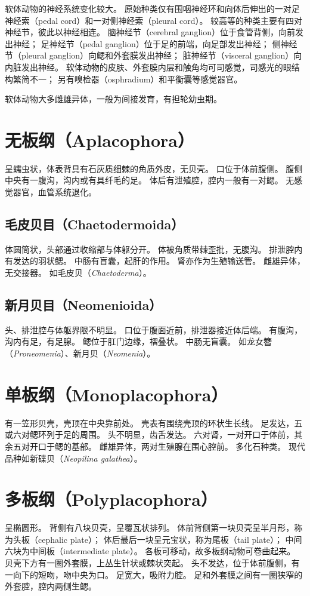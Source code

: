 \documentclass[11pt]{article}
\begin{document}
软体动物的神经系统变化较大。
原始种类仅有围咽神经环和向体后伸出的一对足神经索（pedal cord）和一对侧神经索（pleural cord）。
较高等的种类主要有四对神经节，彼此以神经相连。
脑神经节（cerebral ganglion）位于食管背侧，向前发出神经；
足神经节（pedal ganglion）位于足的前端，向足部发出神经；
侧神经节（pleural ganglion）向鳃和外套膜发出神经；
脏神经节（visceral ganglion）向内脏发出神经。
软体动物的皮肤、外套膜内层和触角均可司感觉，司感光的眼结构繁简不一；
另有嗅检器（osphradium）和平衡囊等感觉器官。

\newline

软体动物大多雌雄异体，一般为间接发育，有担轮幼虫期。
  
\section{无板纲（Aplacophora）}
呈蠕虫状，体表背具有石灰质细棘的角质外皮，无贝壳。
口位于体前腹侧。
腹侧中央有一腹沟，沟内或有具纤毛的足。
体后有泄殖腔，腔内一般有一对鳃。
无感觉器官，血管系统退化。

\subsection{毛皮贝目（Chaetodermoida）}
体圆筒状，头部通过收缩部与体躯分开。
体被角质带棘歪批，无腹沟。
排泄腔内有发达的羽状鳃。
中肠有盲囊，起肝的作用。
肾亦作为生殖输送管。
雌雄异体，无交接器。
如毛皮贝（\textit{Chaetoderma}）。

\subsection{新月贝目（Neomenioida）}
头、排泄腔与体躯界限不明显。
口位于腹面近前，排泄器接近体后端。
有腹沟，沟内有足，有足腺。
鳃位于肛门边缘，褶叠状。
中肠无盲囊。
如龙女簪（\textit{Proneomenia}）、新月贝（\textit{Neomenia}）。

\section{单板纲（Monoplacophora）}
有一笠形贝壳，壳顶在中央靠前处。
壳表有围绕壳顶的环状生长线。
足发达，五或六对鳃环列于足的周围。
头不明显，齿舌发达。
六对肾，一对开口于体前，其余五对开口于鳃的基部。
雌雄异体，两对生殖腺在围心腔前。
多化石种类。
现代品种如新碟贝（\textit{Neopilina galathea}）。

\section{多板纲（Polyplacophora）}
呈椭圆形。
背侧有八块贝壳，呈覆瓦状排列。
体前背侧第一块贝壳呈半月形，称为头板（cephalic plate）；
体后最后一块呈元宝状，称为尾板（tail plate）；
中间六块为中间板（intermediate plate）。
各板可移动，故多板纲动物可卷曲起来。
贝壳下方有一圈外套膜，上丛生针状或棘状突起。
头不发达，位于体前腹侧，有一向下的短吻，吻中央为口。
足宽大，吸附力腔。
足和外套膜之间有一圈狭窄的外套腔，腔内两侧生鳃。
\end{document}
